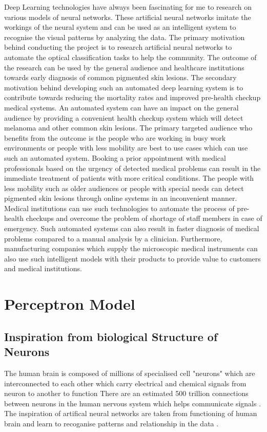 Deep Learning technologies have always been fascinating for me to research on various models of neural networks. These artificial neural networks imitate the workings of the neural system and can be used as an intelligent system to recognise the visual patterns by analyzing the data. The primary motivation behind conducting the project is to research artificial neural networks to automate the optical classification tasks to help the community. The outcome of the research can be used by the general audience and healthcare institutions towards early diagnosis of common pigmented skin lesions. The secondary motivation behind developing such an automated deep learning system is to contribute towards reducing the mortality rates and improved pre-health checkup medical systems. An automated system can have an impact on the general audience by providing a convenient health checkup system which will detect melanoma and other common skin lesions.
The primary targeted audience who benefits from the outcome is the people who are working in busy work environments or people with less mobility are best to use cases which can use such an automated system. Booking a prior appointment with medical professionals based on the urgency of detected medical problems can result in the immediate treatment of patients with more critical conditions. The people with less mobility such as older audiences or people with special needs can detect pigmented skin lesions through online systems in an inconvenient manner. Medical institutions can use such technologies to automate the process of pre-health checkups and overcome the problem of shortage of staff members in case of emergency. Such automated systems can also result in faster diagnosis of medical problems compared to a manual analysis by a clinician. Furthermore, manufacturing companies which supply the microscopic medical instruments can also use such intelligent models with their products to provide value to customers and medical institutions. 

\pagebreak

\section{Perceptron Model}
\subsection{Inspiration from biological Structure of Neurons}
The human brain is composed of millions of specialised cell "neurons" which are interconnected to each other which carry electrical and chemical signals from neuron to another to function
There are an estimated 500 trillion connections between neurons in the human nervous system which helps communicate signals \citep{patterson2017deep}.
The inspiration of artifical neural networks are taken from functioning of human brain and learn to recoganise patterns and relationship in the data \citep{AGATONOVICKUSTRIN2000717}. 
